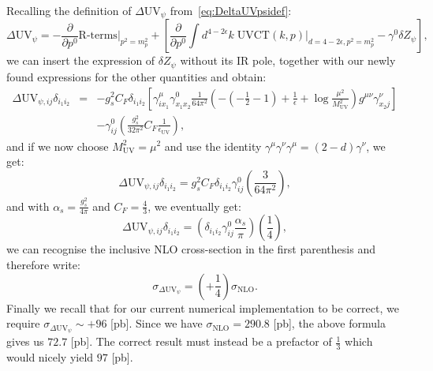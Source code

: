 \documentclass[11pt]{article}
\begin{document}
Recalling the definition of $\Delta \textrm{UV}_\psi$ from~\eqref{eq:DeltaUVpsidef}:
\begin{equation}
\Delta \textrm{UV}_\psi = -\frac{\partial}{\partial p^0}\textrm{R-terms}|_{p^2=m_p^2}  + \left[
\frac{\partial}{\partial p^0} \int d^{4-2\epsilon}k\; \textrm{UVCT}(k,p){\Big |}_{d=4-2\epsilon, p^2=m_p^2 }
- \gamma^0 \delta Z_\psi
\right ],
\end{equation}
we can insert the expression of $\delta Z_\psi$ without its IR pole, together with our newly found expressions for the other quantities and obtain:
\begin{eqnarray}
\Delta \textrm{UV}_{\psi,ij} \delta_{i_1 i_2} &=& -g_s^2 C_F \delta_{i_1 i_2} \left[ 
\gamma_{i x_1}^\mu
\gamma_{x_1 x_2}^0 \frac{1}{64\pi^2}\left(
-(-\frac{1}{2}-1)+
\frac{1}{\epsilon} + \log{\frac{\mu^2}{M_\textrm{UV}^2}}
\right)
g^{\mu\nu}\gamma_{x_2 j}^\nu
\right] \nonumber \\
&&- \gamma^0_{ij} \left( \frac{g_s^2}{32\pi^2} C_F \frac{1}{\epsilon_{\textrm{UV}}} \right),
\end{eqnarray}
and if we now choose $M_\textrm{UV}^2=\mu^2$ and use the identity $\gamma^\mu \gamma^\nu \gamma^\mu=(2-d) \gamma^\nu$, we get:
\begin{equation}
\Delta \textrm{UV}_{\psi,ij} \delta_{i_1 i_2} = g_s^2 C_F \delta_{i_1 i_2} \gamma^0_{ij} \left( 
\frac{3}{64\pi^2}
\right),
\end{equation}
and with $\alpha_s=\frac{g_s^2}{4\pi}$ and $C_F=\frac{4}{3}$, we eventually get:
\begin{equation}
\Delta \textrm{UV}_{\psi,ij} \delta_{i_1 i_2} = \left( \delta_{i_1 i_2} \gamma^0_{ij} \frac{\alpha_s}{\pi} \right) \left(\frac{1}{4}\right), 
\end{equation}
we can recognise the inclusive NLO cross-section in the first parenthesis and therefore write:
\begin{equation}
\sigma_{\Delta \textrm{UV}_{\psi}} = \left(+\frac{1}{4}\right) \sigma_{\textrm{NLO}}.
\end{equation}
Finally we recall that for our current numerical implementation to be correct, we require $\sigma_{\Delta \textrm{UV}_{\psi}}\sim +96$ [pb]. Since we have $\sigma_{\textrm{NLO}}=290.8$ [pb], the above formula gives us $72.7$ [pb].
The correct result must instead be a prefactor of $\frac{1}{3}$ which would nicely yield $97$ [pb].



\end{document}
